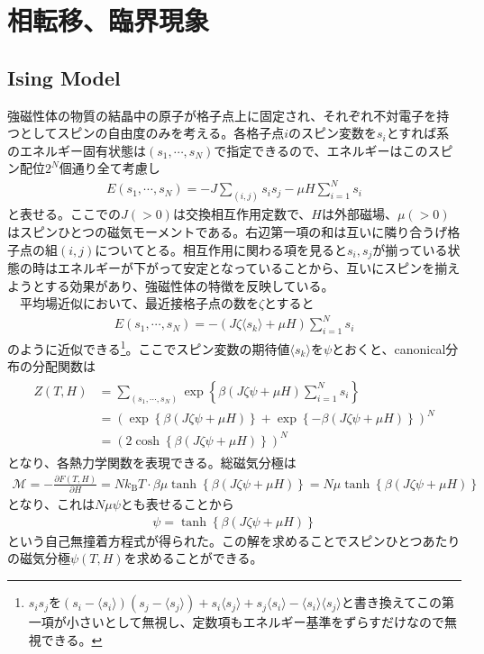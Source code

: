 \documentclass[a4paper,12pt, oneside, openany]{jsbook}
\begin{document}
\section{相転移、臨界現象}
\subsection{Ising Model}
強磁性体の物質の結晶中の原子が格子点上に固定され、それぞれ不対電子を持つとしてスピンの自由度のみを考える。各格子点$i$のスピン変数を$s_i$とすれば系のエネルギー固有状態は$(s_1,\cdots ,s_N)$で指定できるので、エネルギーはこのスピン配位$2^N$個通り全て考慮し
\begin{eqnarray}
  E(s_1,\cdots ,s_N) =-J\sum_{(i,j)}s_i s_j -\mu H \sum_{i=1}^N s_i
\end{eqnarray}
と表せる。ここでの$J(>0)$は交換相互作用定数で、$H$は外部磁場、$\mu(>0)$はスピンひとつの磁気モーメントである。右辺第一項の和は互いに隣り合うげ格子点の組$(i,j)$についてとる。相互作用に関わる項を見ると$s_i,s_j$が揃っている状態の時はエネルギーが下がって安定となっていることから、互いにスピンを揃えようとする効果があり、強磁性体の特徴を反映している。\\
　平均場近似において、最近接格子点の数を$\zeta$とすると
\begin{eqnarray}
  E(s_1,\cdots ,s_N) =-(J \zeta \langle s_k \rangle  +\mu H )\sum_{i=1}^N s_i
\end{eqnarray}
のように近似できる\footnote{$s_i s_j$を$(s_i-\langle s_i \rangle )(s_j-\langle s_j \rangle )+s_i \langle s_j \rangle+s_j \langle s_i \rangle- \langle s_i \rangle \langle s_j \rangle$と書き換えてこの第一項が小さいとして無視し、定数項もエネルギー基準をずらすだけなので無視できる。}。ここでスピン変数の期待値$\langle s_k \rangle$を$\psi $とおくと、canonical分布の分配関数は
\begin{eqnarray}
  \begin{split}
    Z(T,H) &= \sum_{(s_1,\cdots ,s_N)}\exp\left\{\beta (J\zeta \psi +\mu H)\sum_{i=1}^N s_i\right\} \\
  &=\left(\exp\left\{\beta (J\zeta \psi +\mu H)\right\}+\exp\left\{-\beta (J\zeta \psi +\mu H)\right\}\right)^N\\
  &=(2\cosh \left\{\beta (J\zeta \psi +\mu H)\right\} )^N
  \end{split}
\end{eqnarray}
となり、各熱力学関数を表現できる。総磁気分極は
\begin{eqnarray}
  \mathcal{M}  = -\frac{\partial F(T,H)}{\partial H}= Nk_{\text{B}}T\cdot \beta \mu \tanh \left\{\beta (J\zeta \psi +\mu H)\right\} =N\mu \tanh \left\{\beta (J\zeta \psi +\mu H)\right\}
\end{eqnarray}
となり、これは$N \mu \psi$とも表せることから
\begin{eqnarray}
  \psi =\tanh \left\{\beta (J\zeta \psi +\mu H)\right\}
\end{eqnarray}
という自己無撞着方程式が得られた。この解を求めることでスピンひとつあたりの磁気分極$\psi(T,H)$を求めることができる。
\end{document}
